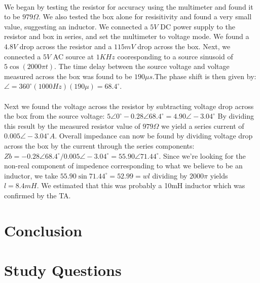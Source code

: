 \documentclass{article}
\begin{document}
\paragraph{}
We began by testing the resistor for accuracy using the multimeter and found
it to be $979\Omega{}$. We also tested the box alone for resisitivity and found
a very small value, suggesting an inductor. We connected a $5V$ DC power supply
to the resistor and box in series, and set the multimeter to voltage mode. We
found a $4.8V$ drop across the resistor and a $115mV$ drop across the box. Next,
we connected a $5V$ AC source at $1KHz$ cooresponding to a source sinusoid of
$5\cos{}(2000\pi{} t)$. The time delay between the source voltage and voltage 
measured across the box was found to be $190\mu{} s$.The phase shift is then 
given by: $\angle{} = 360^\circ{}(1000Hz)(190\mu{}) = 68.4^\circ{}$. 

\paragraph{} 
Next we found the voltage across the resistor by subtracting voltage drop across
the box from the source voltage:
$5\angle{}0^\circ{} - 0.28\angle{}68.4^\circ{} = 4.90\angle{}-3.04^\circ{}$ By
dividing this result by the measured resistor value of $979\Omega$ we yield a 
series current of $0.005\angle{}-3.04^\circ{}A$. Overall impedance can now be 
found by dividing voltage drop across the box by the current through the series
components: 
$Zb= -0.28\angle{}68.4^\circ{} / 0.005\angle{}-3.04^\circ{} = 55.90\angle{}71.44^\circ{}$.
Since we're looking for the non-real component of impedence corresponding to what 
we believe to be an inductor, we take $55.90\sin{}71.44^\circ{} = 52.99 = wl$ 
dividing by $2000\pi{}$ yields $l=8.4mH$. We estimated that this was probably
a 10mH inductor which was confirmed by the TA.   

\section*{Conclusion}

\section*{Study Questions}
\end{document}
